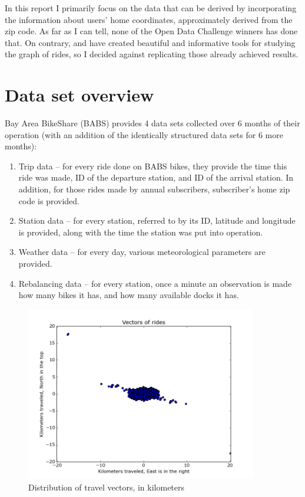\documentclass{article}
\begin{document}
In this report I primarily focus on the data that can be derived by incorporating the information about users' home coordinates, approximately derived from the zip code. As far as I can tell, none of the Open Data Challenge winners has done that. On contrary, \cite{mousebird} and \cite{planetbabs} have created beautiful and informative tools for studying the graph of rides, so I decided against replicating those already achieved results.

\section{Data set overview}
\label{sec:dsover}

Bay Area BikeShare (BABS) provides 4 data sets collected over 6 months of their operation (with an addition of the identically structured data sets for 6 more months):
\begin{enumerate}
	\item
		Trip data -- for every ride done on BABS bikes, they provide the time this ride was made, ID of the departure station, and ID of the arrival station. In addition, for those rides made by annual subscribers, subscriber's home zip code is provided.
	\item
		Station data -- for every station, referred to by its ID, latitude and longitude is provided, along with the time the station was put into operation.
	\item
		Weather data -- for every day, various meteorological parameters are provided.
	\item
		Rebalancing data -- for every station, once a minute an observation is made how many bikes it has, and how many available docks it has.
\end{enumerate}

\begin{figure}
	\centering
	\includegraphics[width=0.9\textwidth]{../travel_vector.png}
	\caption{Distribution of travel vectors, in kilometers}
	\label{fig:travelvector}
\end{figure}
\end{document}
